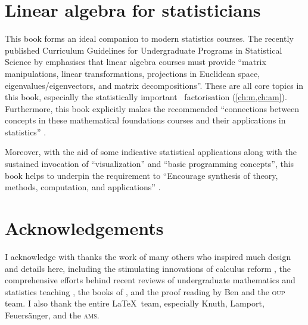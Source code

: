 \section*{Linear algebra for statisticians}

This book forms an ideal companion to modern statistics courses.
The recently published Curriculum Guidelines for Undergraduate Programs in Statistical Science by \cite{StatsEduGuidelines2014} emphasises that linear algebra courses must provide ``matrix manipulations, linear transformations, projections in Euclidean space, eigenvalues\slash eigenvectors, and matrix decompositions''.
These are all core topics in this book, especially the statistically 
important \svd\ factorisation (\cref{ch:m,ch:am}).
Furthermore, this book explicitly makes the recommended ``connections between concepts in these mathematical foundations courses and their applications in statistics'' \cite[p.12]{StatsEduGuidelines2014}.

Moreover, with the aid of some indicative statistical applications along with the sustained invocation of ``visualization'' and  ``basic programming concepts'', this book helps to underpin the requirement to ``Encourage synthesis of theory, methods, computation, and applications'' \cite[p.13]{StatsEduGuidelines2014}.






\section*{Acknowledgements}

I acknowledge with thanks the work of many others who inspired much design and details here, including 
the stimulating innovations of calculus reform \cite[e.g.]{HughesHallett2013},  
the comprehensive efforts behind recent reviews of  undergraduate mathematics and statistics teaching \cite[e.g.]{Alpers2013, Bressoud2014, Turner2014, StatsEduGuidelines2014, CUPMguide2015, gaimme2016}, 
the books of \cite{Anton6, Davis99a, Holt2013, Larson2013, Lay2012, Nakos1998, Poole2015, Will04},
and the proof reading by Ben and the \textsc{oup} team.
I also thank the entire \LaTeX\ team, especially Knuth, Lamport, Feuers\"anger, and the \textsc{ams}.








